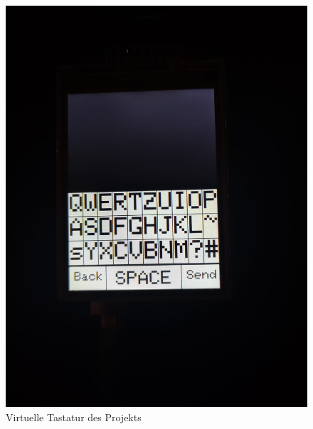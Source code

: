 \documentclass[a4paper, 11pt]{scrartcl}
\begin{document}
\begin{small}
\begin{figure}[H]
    \begin{center}
        \includegraphics[scale=0.13]{Bilder/Keys_standard.jpeg}
        \caption{Virtuelle Tastatur des Projekts}\label{pic:keys_standard}
    \end{center}
\end{figure}


\end{small}
\end{document}
